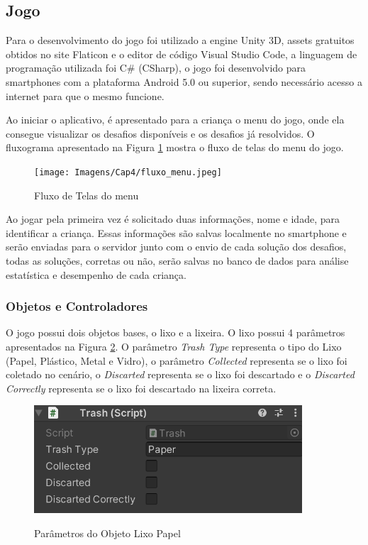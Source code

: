     \subsection{Jogo}
    
    Para o desenvolvimento do jogo foi utilizado a engine Unity 3D, assets gratuitos obtidos no site Flaticon e o editor de código Visual Studio Code, a linguagem de programação utilizada foi C\# (CSharp), o jogo foi desenvolvido para smartphones com a plataforma Android 5.0 ou superior, sendo necessário acesso a internet para que o mesmo funcione.
    
    Ao iniciar o aplicativo, é apresentado para a criança o menu do jogo, onde ela consegue visualizar os desafios disponíveis e os desafios já resolvidos. O fluxograma apresentado na Figura \ref{figura:fluxo_telas} mostra o fluxo de telas do menu do jogo.
    
    \begin{figure}[H]
        \caption{Fluxo de Telas do menu}
        \centering
        \texttt{[image: Imagens/Cap4/fluxo\_menu.jpeg]}
        \label{figura:fluxo_telas}
    \end{figure}
    
    Ao jogar pela primeira vez é solicitado duas informações, nome e idade, para identificar a criança. Essas informações são salvas localmente no smartphone e serão enviadas para o servidor junto com o envio de cada solução dos desafios, todas as soluções, corretas ou não, serão salvas no banco de dados para análise estatística e desempenho de cada criança.
    
    \subsubsection{Objetos e Controladores}
    
    O jogo possui dois objetos bases, o lixo e a lixeira. O lixo possui 4 parâmetros apresentados na Figura \ref{figura:parametros_lixo}. O parâmetro \textit{Trash Type} representa o tipo do Lixo (Papel, Plástico, Metal e Vidro), o parâmetro \textit{Collected} representa se o lixo foi coletado no cenário, o \textit{Discarted} representa se o lixo foi descartado e o \textit{Discarted Correctly} representa se o lixo foi descartado na lixeira correta. 
    
    \begin{figure}[H]
        \caption{Parâmetros do Objeto Lixo Papel}
        \centering
        \includegraphics[width=10cm]{Imagens/Cap4/parametros_lixo.png}
        \label{figura:parametros_lixo}
    \end{figure}
    
